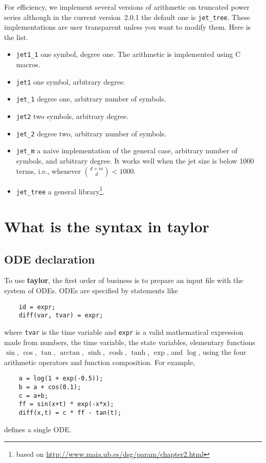 \documentclass[10pt]{article}
\theoremstyle{remark}
\newcommand{\taylorname}{{\bf taylor}}
\newcommand{\version}{2.0.1}
\begin{document}
For efficiency, we implement several versions of arithmetic on
truncated power series although in the current version~\version{} the
default one is \verb+jet_tree+. These implementations are user
transparent unless you want to modify them. Here is the list.
\begin{itemize}
    \item \verb+jet1_1+ one symbol, degree one. The arithmetic is
      implemented using C macros.
    \item \verb+jet1+ one symbol, arbitrary degree. 
    \item \verb+jet_1+ degree one, arbitrary number of symbols.
    \item \verb+jet2+ two symbols, arbitrary degree.
    \item \verb+jet_2+ degree two, arbitrary number of symbols.
    \item \verb+jet_m+ a naive implementation of the general case,
      arbitrary number of symbols, and arbitrary degree. It works well
      when the jet size is below 1000 terms, i.e., whenever ${{d+m}
        \choose {d}} < 1000$.
    \item \verb+jet_tree+ a general library\footnote{based on \url{   http://www.maia.ub.es/dsg/param/chapter2.html}}.
\end{itemize}


\section{What is the syntax in \taylorname{}} \label{sec:syntax}

\subsection*{ODE declaration}
To use \taylorname{}, the first order of business is to prepare an
input file with the system of ODEs.  ODEs are specified by statements
like
\begin{verbatim}
    id = expr;
    diff(var, tvar) = expr;
\end{verbatim}
where {\tt tvar} is the time variable and {\tt expr} is a valid
mathematical expression made from numbers, the time variable, the
state variables, elementary functions $\sin$, $\cos$, $\tan$,
$\arctan$, $\sinh$, $\cosh$, $\tanh$, $\exp$, and $\log$, using the
four arithmetic operators and function composition. For example,
\begin{verbatim}
    a = log(1 + exp(-0.5));
    b = a + cos(0.1);
    c = a+b;
    ff = sin(x+t) * exp(-x*x);
    diff(x,t) = c * ff - tan(t);
\end{verbatim}
defines a single ODE.
\end{document}
